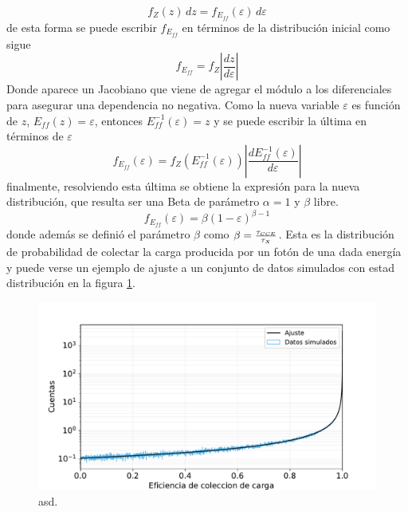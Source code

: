 \begin{equation*}
    f_{Z}(z)\,dz = f_{E_{ff}}(\varepsilon)\,d\varepsilon
\end{equation*}
de esta forma se puede escribir $f_{E_{ff}}$ en términos de la distribución inicial como sigue
\begin{equation*}
    f_{E_{ff}} 
    = f_{Z}
    \left|
        \frac{dz}{d\varepsilon}
    \right|
\end{equation*}
Donde aparece un Jacobiano que viene de agregar el módulo a los diferenciales para asegurar una dependencia no negativa. Como la nueva variable $\varepsilon$ es función de $z$, $E_{ff}(z) = \varepsilon$, entonces $E_{ff}^{-1}(\varepsilon) = z$ y se puede escribir la última en términos de $\varepsilon$
\begin{equation*}
    f_{E_{ff}}(\varepsilon) 
    = f_{Z}
    \left(
        E_{ff}^{-1}(\varepsilon)
    \right)
    \left|
        \frac{dE_{ff}^{-1}(\varepsilon)}{d\varepsilon}
    \right|
\end{equation*}
finalmente, resolviendo esta última se obtiene la expresión para la nueva distribución, que resulta ser una Beta de parámetro $\alpha = 1$ y $\beta$ libre.
\begin{equation*}
    f_{E_{ff}}(\varepsilon) = \beta (1 - \varepsilon)^{\beta - 1}
\end{equation*}
donde además se definió el parámetro $\beta$ como $\beta = \frac{\tau_{\scaleto{CCE}{3pt}}}{\tau_{\scaleto{X}{3pt}}}$. Esta es la distribución de probabilidad de colectar la carga producida por un fotón de una dada energía y puede verse un ejemplo de ajuste a un conjunto de datos simulados con estad distribución en la figura \ref{fig:BetaDistyAjuste}.
\begin{figure}[h]
    \centering
        \includegraphics[scale=0.5]{Figs/BetaDistyAjuste.pdf}
    \caption{\footnotesize{asd.}}
    \label{fig:BetaDistyAjuste}
\end{figure}


